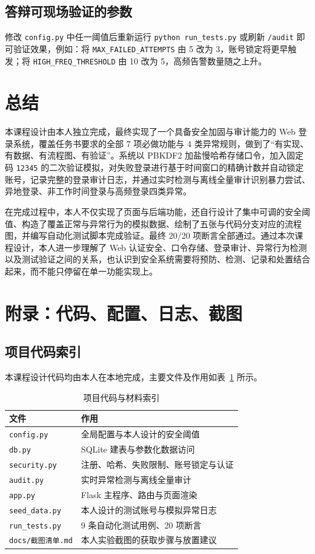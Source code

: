 \documentclass[bwprint]{report}
\begin{document}
\subsection{答辩可现场验证的参数}
修改 \texttt{config.py} 中任一阈值后重新运行 \texttt{python run\_tests.py} 或刷新 \texttt{/audit} 即可验证效果，例如：将 \texttt{MAX\_FAILED\_ATTEMPTS} 由 5 改为 3，账号锁定将更早触发；将 \texttt{HIGH\_FREQ\_THRESHOLD} 由 10 改为 5，高频告警数量随之上升。

\section{总结}
本课程设计由本人独立完成，最终实现了一个具备安全加固与审计能力的 Web 登录系统，覆盖任务书要求的全部 7 项必做功能与 4 类异常规则，做到了“有实现、有数据、有流程图、有验证”。系统以 PBKDF2 加盐慢哈希存储口令，加入固定码 \texttt{12345} 的二次验证模拟，对失败登录进行基于时间窗口的精确计数并自动锁定账号，记录完整的登录审计日志，并通过实时检测与离线全量审计识别暴力尝试、异地登录、非工作时间登录与高频登录四类异常。

在完成过程中，本人不仅实现了页面与后端功能，还自行设计了集中可调的安全阈值、构造了覆盖正常与异常行为的模拟数据、绘制了五张与代码分支对应的流程图，并编写自动化测试脚本完成验证。最终 20/20 项断言全部通过。通过本次课程设计，本人进一步理解了 Web 认证安全、口令存储、登录审计、异常行为检测以及测试验证之间的关系，也认识到安全系统需要将预防、检测、记录和处置结合起来，而不能只停留在单一功能实现上。

\section{附录：代码、配置、日志、截图}
\subsection{项目代码索引}
本课程设计代码均由本人在本地完成，主要文件及作用如表~\ref{tab:appendix-files} 所示。

\begin{table}[H]
    \caption{项目代码与材料索引}
    \label{tab:appendix-files}
    \centering
    \begin{tabular}{ll}
        \toprule[1.5pt]
        文件 & 作用 \\
        \midrule[1pt]
        \texttt{config.py} & 全局配置与本人设计的安全阈值 \\
        \texttt{db.py} & SQLite 建表与参数化数据访问 \\
        \texttt{security.py} & 注册、哈希、失败限制、账号锁定与认证 \\
        \texttt{audit.py} & 实时异常检测与离线全量审计 \\
        \texttt{app.py} & Flask 主程序、路由与页面渲染 \\
        \texttt{seed\_data.py} & 本人设计的测试账号与模拟异常日志 \\
        \texttt{run\_tests.py} & 9 条自动化测试用例、20 项断言 \\
        \texttt{docs/截图清单.md} & 本人实验截图的获取步骤与放置建议 \\
        \bottomrule[1.5pt]
    \end{tabular}
\end{table}
\end{document}
